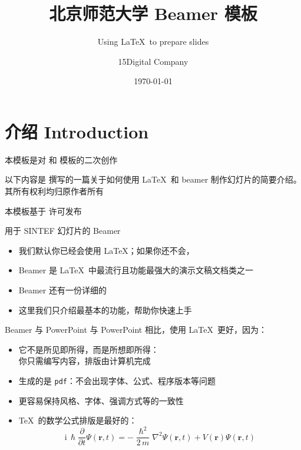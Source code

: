 \documentclass{beamer}
\title{北京师范大学 Beamer 模板}
\subtitle{Using \LaTeX\ to prepare slides}
\author{15Digital Company}
\date{\today}
\begin{document}
\maketitle

\section{介绍 Introduction}

\begin{frame}
    本模板是对  和  模板的二次创作 \vspace{\baselineskip}

    以下内容是  撰写的一篇关于如何使用 \LaTeX\ 和 beamer 制作幻灯片的简要介绍。其所有权利均归原作者所有\vspace{\baselineskip}

    本模板基于  许可发布
\end{frame}

\begin{frame}{用于 SINTEF 幻灯片的 Beamer}
    \begin{itemize}
        \item 我们默认你已经会使用 \LaTeX；如果你还不会，
        \item Beamer 是 \LaTeX\ 中最流行且功能最强大的演示文稿文档类之一
        \item Beamer 还有一份详细的
        \item 这里我们只介绍最基本的功能，帮助你快速上手
    \end{itemize}
\end{frame}

\begin{frame}{Beamer 与 PowerPoint}
    与 PowerPoint 相比，使用 \LaTeX\ 更好，因为：
    \begin{itemize}
        \item 它不是所见即所得，而是所想即所得：\\
              你只需编写内容，排版由计算机完成
        \item 生成的是 \texttt{pdf}：不会出现字体、公式、程序版本等问题
        \item 更容易保持风格、字体、强调方式等的一致性
        \item \TeX\ 的数学公式排版是最好的：
              \begin{equation*}
                  \mathrm{i}\,\hslash\frac{\partial}{\partial t} \Psi(\mathbf{r},t) =
                  -\frac{\hslash^2}{2\,m}\nabla^2\Psi(\mathbf{r},t)
                  + V(\mathbf{r})\Psi(\mathbf{r},t)
              \end{equation*}
    \end{itemize}
\end{frame}
\end{document}

